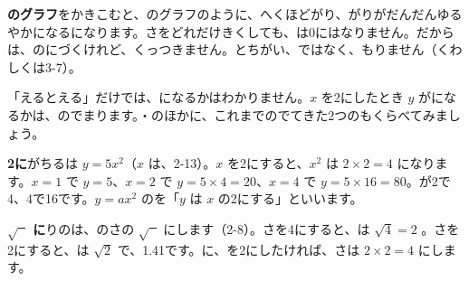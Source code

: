 \textbf{のグラフ}\quad {}をかきこむと、のグラフのように、へくほどがり、がりがだんだんゆるやかになるになります。さをどれだけきくしても、は0にはなりません。だからは、のにづくけれど、くっつきません。とちがい、ではなく、もりません（くわしくは3-7）。


\leavevmode\label{bk:2-15:bai}「えるとえる」だけでは、になるかはわかりません。$x$ を2にしたとき $y$ がになるかは、のでまります。・のほかに、これまでのでてきた2つのもくらべてみましょう。

\textbf{2に}\quad {}がちるは $y=5x^2$（$x$ は、2-13）。$x$ を2にすると、$x^2$ は $2\times2=4$ になります。$x=1$ で $y=5$、$x=2$ で $y=5\times4=20$、$x=4$ で $y=5\times16=80$。が2で4、4で16です。$y=ax^2$ のを「$y$ は $x$ の2にする」といいます。

\textbf{$\sqrt{\phantom{x}}$ に}\quad {}りのは、のさの $\sqrt{\phantom{x}}$ にします（2-8）。さを4にすると、は $\sqrt{4}=2$ 。さを2にすると、は $\sqrt{2}$ で、1.41です。に、を2にしたければ、さは $2\times2=4$ にします。

